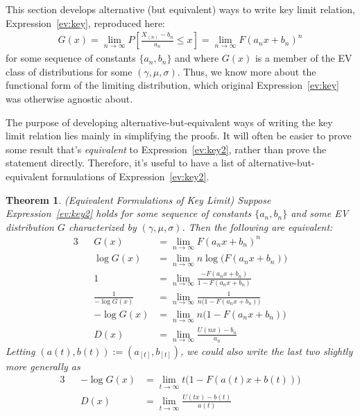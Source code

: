 \documentclass[12pt]{article}
\theoremstyle{plain}
\newtheorem{thm}{Theorem}[section]
\theoremstyle{definition}
\theoremstyle{remark}
\newcommand{\ra}{\rightarrow}
\newcommand{\limn}{\lim_{n\rightarrow\infty}}
\newcommand{\limt}{\lim_{t\rightarrow\infty}}
\begin{document}
This section develops alternative (but equivalent) ways to write key limit
relation, Expression~\ref{ev:key}, reproduced here:
\begin{align}
  G(x)
  =\lim_{n\ra\infty}P\left[\frac{X_{(n)}-b_n}{a_n} \leq x\right]
  =\lim_{n\ra\infty}F(a_nx+b_n)^n
  \label{ev:key2}
\end{align}
for some sequence of constants $\{a_n,b_n\}$ and where $G(x)$ is a
member of the EV class of distributions for some $(\gamma,\mu,\sigma)$.
Thus, we know more about the functional form of the limiting
distribution, which original Expression~\ref{ev:key} was otherwise
agnostic about.

The purpose of developing alternative-but-equivalent ways of writing the
key limit relation lies mainly in simplifying the proofs.
It will often be easier to prove some result that's \emph{equivalent}
to Expression~\ref{ev:key2}, rather than prove the statement directly.
Therefore, it's useful to have a list of alternative-but-equivalent
formulations of Expression~\ref{ev:key2}.



\begin{thm}\emph{(Equivalent Formulations of Key Limit)}
Suppose Expression~\ref{ev:key2} holds for some sequence of constants
$\{a_n,b_n\}$ and some EV distribution $G$ characterized by
$(\gamma,\mu,\sigma)$. Then the following are equivalent:
\begin{alignat*}{3}
  &&
  G(x)
  &=\lim_{n\ra\infty}F(a_nx+b_n)^n
  \\
  &&
  \log G(x) &=\lim_{n\ra\infty}n \log\big(F(a_nx+b_n)\big)
  \\
  &&
  1 &=\lim_{n\ra\infty} \frac{-F(a_nx+b_n)}{1-F(a_nx+b_n)}
  \\
  &&
  \frac{1}{-\log G(x)}
  &=\lim_{n\ra\infty} \frac{1}{n\big(1-F(a_nx+b_n)\big)}
  \\
  &&
  -\log G(x)
  &=\lim_{n\ra\infty} n\big(1-F(a_nx+b_n)\big)
  \\
  &&
  D(x)
  &=
  \limn
  \frac{U(nx)-b_n}{a_n}
\end{alignat*}
Letting $(a(t),b(t)):=(a_{[t]},b_{[t]})$, we could also write the last
two slightly more generally as
\begin{alignat*}{3}
  &&
  -\log G(x)
  &=\limt t\big(1-F(a(t)x+b(t))\big)
  \\
  &&
  D(x)
  &=
  \limt
  \frac{U(tx)-b(t)}{a(t)}
\end{alignat*}
\end{thm}
\end{document}
